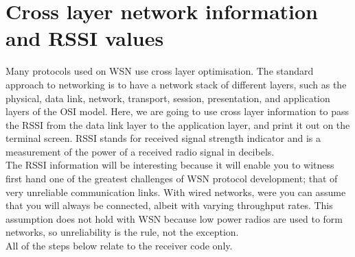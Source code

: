 \documentclass [a4] {article}
\begin{document}
\section{Cross layer network information and RSSI values}

Many protocols used on WSN use cross layer optimisation. The standard approach to networking is to have a network stack of different layers, such as the physical, data link, network, transport, session, presentation, and application layers of the OSI model. Here, we are going to use cross layer information to pass the RSSI from the data link layer to the application layer, and print it out on the terminal screen. RSSI stands for received signal strength indicator and is a measurement of the power of a received radio signal in decibels. \\

The RSSI information will be interesting because it will enable you to witness first hand one of the greatest challenges of WSN protocol development; that of very unreliable communication links. With wired networks, were you can assume that you will always be connected, albeit with varying throughput rates. This assumption does not hold with WSN because low power radios are used to form networks, so unreliability is the rule, not the exception. \\

All of the steps below relate to the receiver code only. \\
\end{document}
